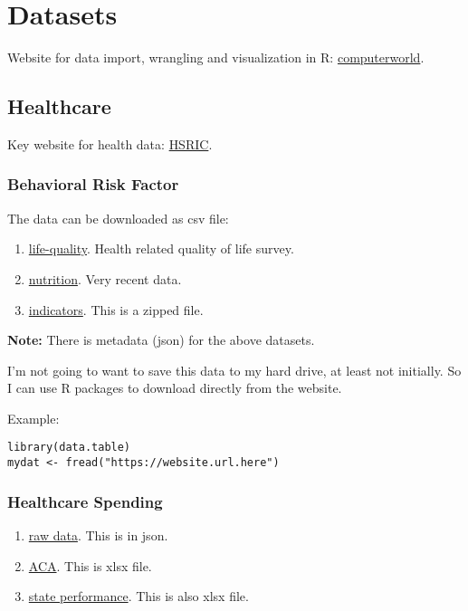 \chapter{Datasets}

Website for data import, wrangling and visualization in R: \href{http://www.computerworld.com/article/2921176/business-intelligence/great-r-packages-for-data-import-wrangling-visualization.html}{computerworld}.\\

\section{Healthcare}
Key website for health data: \href{https://www.nlm.nih.gov/hsrinfo/datasites.html}{HSRIC}.\\
\subsection{Behavioral Risk Factor}
The data can be downloaded as csv file:
\begin{enumerate}
\item \href{https://chronicdata.cdc.gov/api/views/xuxn-8kju/rows.csv?accessType=DOWNLOAD}{life-quality}. Health related quality of life survey.
\item \href{https://chronicdata.cdc.gov/api/views/hn4x-zwk7/rows.csv?accessType=DOWNLOAD}{nutrition}. Very recent data.
\item \href{ftp://ftp.cdc.gov/pub/Health_Statistics/NCHS/Datasets/CHDI/chsi_dataset.zip}{indicators}. This is a zipped file. 
\end{enumerate}

\textbf{Note:} There is metadata (json) for the above datasets.

I'm not going to want to save this data to my hard drive, at least not initially. So I can use R packages to download directly from the website.

Example:
\begin{verbatim}
library(data.table)
mydat <- fread("https://website.url.here")
\end{verbatim}

\subsection{Healthcare Spending}

\begin{enumerate}
\item \href{https://meps.ahrq.gov/mepsweb/data_stats/download_data_files.jsp}{raw data}. This is in json.
\item \href{https://aspe.hhs.gov/system/files/aspe-files/253321/dec2016statebystate.xlsx}{ACA}. This is xlsx file.
\item \href{http://www.commonwealthfund.org/~/media/Files/2017%20State%20Scorecard/Public%20Use%20File/2017_state_scorecard_public_use_data_file.xlsx}{state performance}. This is also xlsx file. 
\end{enumerate}

